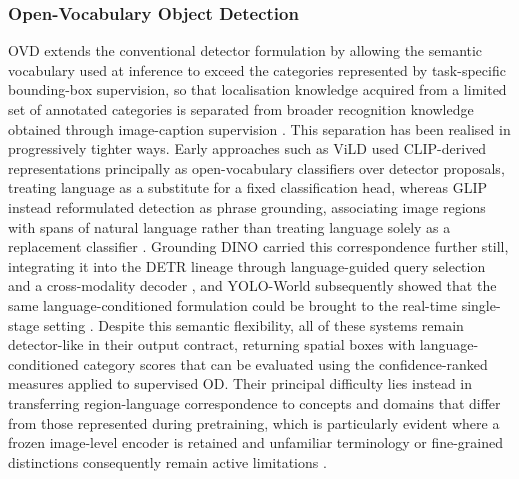 \subsubsection{Open-Vocabulary Object Detection}
\label{sec:bg-open-vocabulary}
\Gls{OVD} extends the conventional detector formulation by allowing the semantic vocabulary used at inference to exceed the categories represented by task-specific bounding-box supervision, so that localisation knowledge acquired from a limited set of annotated categories is separated from broader recognition knowledge obtained through image-caption supervision \cite{zareian2021open}. This separation has been realised in progressively tighter ways. Early approaches such as ViLD \cite{vild-paper} used \gls{CLIP}-derived representations principally as open-vocabulary classifiers over detector proposals, treating language as a substitute for a fixed classification head, whereas GLIP \cite{glip-paper} instead reformulated detection as phrase grounding, associating image regions with spans of natural language rather than treating language solely as a replacement classifier \cite{du2022detpro,zhu2024openvocabulary}. Grounding DINO carried this correspondence further still, integrating it into the \gls{DETR} lineage through language-guided query selection and a cross-modality decoder \cite{liu2024grounding}, and YOLO-World subsequently showed that the same language-conditioned formulation could be brought to the real-time single-stage setting \cite{cheng2024yoloworld}. Despite this semantic flexibility, all of these systems remain detector-like in their output contract, returning spatial boxes with language-conditioned category scores that can be evaluated using the confidence-ranked measures applied to supervised \gls{OD}. Their principal difficulty lies instead in transferring region-language correspondence to concepts and domains that differ from those represented during pretraining, which is particularly evident where a frozen image-level encoder is retained and unfamiliar terminology or fine-grained distinctions consequently remain active limitations \cite{BG37-open-vocabulary,zhu2024openvocabulary}.

